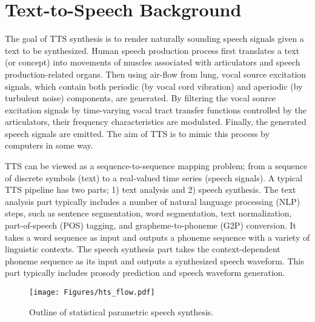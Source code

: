 \documentclass{article}
\begin{document}
\appendix 

\section{Text-to-Speech Background}
The goal of TTS synthesis is to render  naturally sounding speech signals given a text to be synthesized.
Human speech production process first translates a text (or concept) into movements of muscles associated with
articulators and speech production-related organs.
Then using air-flow from lung, vocal source excitation signals, which contain both periodic
(by vocal cord vibration) and aperiodic (by turbulent noise) components, are generated.
By filtering the vocal source excitation signals by time-varying vocal tract transfer functions
controlled by the articulators, their frequency characteristics are modulated.
Finally, the generated speech signals are emitted.
The aim of TTS is to mimic this process by computers in some way.

TTS can be viewed as a sequence-to-sequence mapping problem;
from a sequence of 
discrete symbols (text) to a real-valued time series (speech signals).
A typical TTS pipeline has two parts; 1) text analysis and 2) speech synthesis.
The text analysis part typically includes a number of natural language processing (NLP) steps,
such as sentence segmentation, word segmentation, text normalization,
part-of-speech (POS) tagging,
and grapheme-to-phoneme (G2P) conversion.
It takes a word sequence as input and outputs
a phoneme sequence with a variety of linguistic contexts.
The speech synthesis part takes the context-dependent phoneme sequence as its input and outputs a synthesized speech waveform.
This part typically includes prosody prediction and speech waveform generation.

\begin{figure}[!t]
  \centering
  \texttt{[image: Figures/hts\_flow.pdf]}
  \caption{Outline of statistical parametric speech synthesis.}
  \label{fig:outline_spss}
\end{figure}
\end{document}
